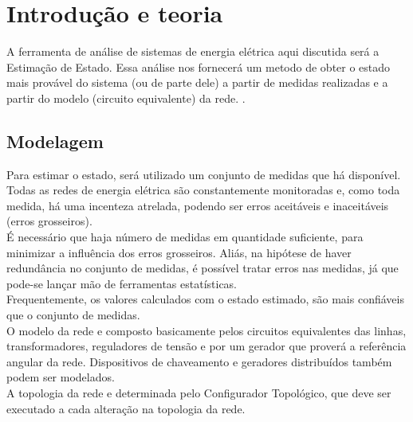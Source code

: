 \chapter{Introdu\c{c}\~ao e teoria}








A ferramenta de an\'alise de sistemas de energia el\'etrica aqui discutida ser\'a a Estimação de Estado. Essa an\'alise nos fornecer\'a um metodo de obter o estado mais provável do sistema (ou de parte dele) a partir de medidas realizadas e a partir do modelo (circuito equivalente) da rede. \cite{monticelli}.
\section{Modelagem}
\label{SectionIntro}
Para estimar o estado, será utilizado um conjunto de medidas que há disponível. Todas as redes de energia elétrica são constantemente monitoradas e, como toda medida, há uma incenteza atrelada, podendo ser erros aceitáveis e inaceitáveis (erros grosseiros).\\
É necessário que haja número de medidas em quantidade suficiente, para minimizar a influência dos erros grosseiros. Aliás, na hipótese de haver redundância no conjunto de medidas, é possível tratar erros nas medidas, já que pode-se lançar mão de ferramentas estatísticas.\\
Frequentemente, os valores calculados com o estado estimado, são mais confiáveis que o conjunto de medidas. \\
O modelo da rede e composto basicamente pelos circuitos equivalentes das linhas, transformadores, reguladores de tensão e por um gerador que proverá a referência angular da rede. Dispositivos de chaveamento e geradores distribuídos também podem ser modelados.\\
A topologia da rede e determinada pelo Configurador Topológico, que deve ser executado a cada alteração na topologia da rede.\cite{castro}

